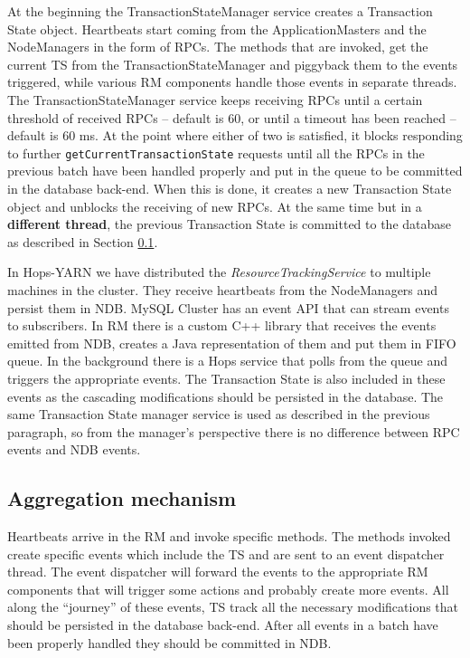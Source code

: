 At the beginning the TransactionStateManager service creates a
Transaction State object. Heartbeats start coming from the
ApplicationMasters and the NodeManagers in the form of RPCs. The
methods that are invoked, get the current TS from the
TransactionStateManager and piggyback them to the events
triggered, while various RM components handle those events in separate
threads.
The TransactionStateManager service keeps receiving RPCs
until a certain threshold of received RPCs -- default is 60, or until
a timeout has been reached -- default is 60 ms. At the point where
either of two is satisfied, it blocks responding to further
\texttt{getCurrentTransactionState} requests until all the RPCs in the
previous batch have been handled properly and put in the queue to be
committed in the database back-end. When this is done, it
creates a new Transaction State object and unblocks the receiving of
new RPCs. At the same time but in a \textbf{different thread}, the previous
Transaction State is committed to the database as described in Section
\ref{ssec:impl_aggr_mechanism}.

In Hops-YARN we have distributed the \emph{ResourceTrackingService} to
multiple machines in the cluster. They receive heartbeats from the
NodeManagers and persist them in NDB. MySQL Cluster has an event API
that can stream events to subscribers. In RM there is a custom C++
library that receives the events emitted from NDB, creates a Java
representation of them and put them in FIFO queue. In the background
there is a Hops service that polls from the queue and triggers the
appropriate events. The Transaction State is also included in these
events as the cascading modifications should be persisted in the
database. The same Transaction State manager service is used as
described in the previous paragraph, so from the manager's perspective
there is no difference between RPC events and NDB events.

\subsection{Aggregation mechanism}
\label{ssec:impl_aggr_mechanism}
Heartbeats arrive in the RM and invoke specific methods. The methods
invoked create specific events which include the TS and are sent to an
event dispatcher thread. The event dispatcher will forward the events
to the appropriate RM components that will trigger some actions and
probably create more events. All along the ``journey'' of these
events, TS track all the necessary modifications that should be
persisted in the database back-end. After all events in a batch have
been properly handled they should be committed in NDB.

